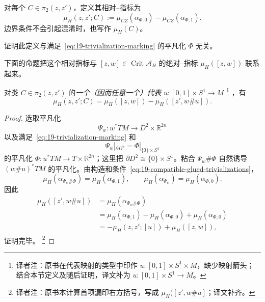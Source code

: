 \begin{definition}
\label{def:relative-conley-zehnder-index}
对每个 $C\in\pi_2(z,z')$，定义其相对\personConley{}--\personZehnder{}指标为
\begin{equation}
 \mu_H(z,z';C):=\mu_{CZ}(\alpha_{\Phi,0})-
 \mu_{CZ}(\alpha_{\Phi,1}).
\label{eq:19-relative-cz-index}
\end{equation}
边界条件不会引起混淆时，也写作 $\mu_H(C)$。
\end{definition}

\begin{exercise}
\label{ex:relative-cz-trivialization-independent}
证明此定义与满足~\eqref{eq:19-trivialization-marking} 的平凡化 $\Phi$ 无关。
\end{exercise}

下面的命题把这个相对指标与
$[z,w]\in\operatorname{Crit}\mathcal A_H$ 的绝对\personConley{}--\personZehnder{}指标
$\mu_H([z,w])$ 联系起来。

\begin{proposition}
\label{prop:relative-absolute-cz-relation}
对类 $C\in\pi_2(z,z')$ 的\emph{一个（因而任意一个）代表}
$u:[0,1]\times S^1\to M$
\footnote{译者注：原书在代表映射的类型中印作
$u:[0,1]\times S^1\times M$，缺少映射箭头；结合本节定义及随后证明，译文补为
$u:[0,1]\times S^1\to M$。}
，有
\begin{equation}
 \mu_H(z,z';C)=\mu_H([z,w])-\mu_H([z',w\#u]).
\label{eq:19-relative-absolute-cz}
\end{equation}
\end{proposition}

\begin{proof}
选取平凡化
\[
 \Psi_w:w^*TM\longrightarrow D^2\times\mathbb R^{2n}
\]
以及满足~\eqref{eq:19-trivialization-marking} 和
\begin{equation}
 \Psi_w|_{\partial D^2}=\Phi|_{\{0\}\times S^1}
\label{eq:19-compatible-glued-trivializations}
\end{equation}
的平凡化 $\Phi:u^*TM\to T\times\mathbb R^{2n}$；这里把
$\partial D^2\cong\{0\}\times S^1$。粘合 $\Psi_w\#\Phi$ 自然诱导
$(w\#u)^*TM$ 的平凡化。由构造和条件~\eqref{eq:19-compatible-glued-trivializations}，
\[
 \mu_H(\alpha_{\Psi_w\#\Phi})=\mu_H(\alpha_{\Phi,1}),
 \qquad
 \mu_H(\alpha_{\Psi_w})=\mu_H(\alpha_{\Phi,0}).
\]
因此
\[
\begin{aligned}
 \mu_H([z',w\#u])
 &=\mu_H(\alpha_{\Psi_w\#\Phi})\\
 &=\mu_H(\alpha_{\Phi,1})-\mu_H(\alpha_{\Phi,0})
   +\mu_H(\alpha_{\Phi,0})\\
 &=-\mu_H(z,z';[u])+\mu_H([z,w]),
\end{aligned}
\]
证明完毕。
\footnote{译者注：原书本计算首项漏印右方括号，写成
$\mu_H([z',w\#u]$；译文补齐。}
\end{proof}

